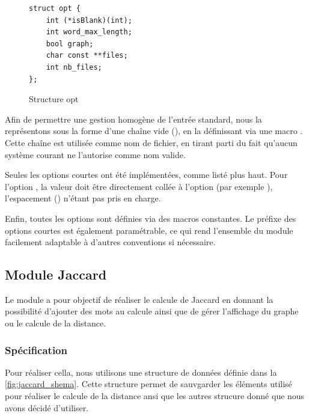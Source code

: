 \documentclass[a4paper, 12pt]{article}
\newcommand{\code}{\commandbox}
\begin{document}
\begin{figure}[h]
\centering
\begin{tcolorbox}[center upper,
enhanced,
colback=darkWhite,
boxrule=0pt,
frame hidden,
width=0.5\textwidth]
\begin{lstlisting}[style=bigCode]
struct opt {
    int (*isBlank)(int);
    int word_max_length;
    bool graph;
    char const **files;
    int nb_files;
};
\end{lstlisting}
\end{tcolorbox}
\caption{Structure opt}
\label{fig:structure_opt}
\end{figure}

Afin de permettre une gestion homogène de l’entrée standard, nous la représentons sous la forme d’une chaîne vide (\code{""}), en la définissant via une macro \code{STDIN}. Cette chaîne est utilisée comme nom de fichier, en tirant parti du fait qu’aucun système courant ne l’autorise comme nom valide.

Seules les options courtes ont été implémentées, comme listé plus haut. Pour l’option \code{-iVALUE}, la valeur doit être directement collée à l’option (par exemple \code{-i3}), l’espacement (\code{-i 3}) n’étant pas pris en charge.

Enfin, toutes les options sont définies via des macros constantes. Le préfixe des options courtes est également paramétrable, ce qui rend l’ensemble du module facilement adaptable à d’autres conventions si nécessaire.


\subsection{Module Jaccard}

Le module \code{jaccard} a pour objectif de réaliser le calcule de Jaccard en donnant la possibilité d'ajouter des mots au calcule ainsi que de gérer l'affichage du graphe ou le calcule de la distance.

\subsubsection{Spécification}

Pour réaliser cella, nous utilisons une structure de données définie dans la \autoref{fig:jaccard_shema}. Cette structure permet de sauvgarder les éléments utilisé pour réaliser le calcule de la distance ansi que les autres strucure donné que nous avons décidé d'utiliser. 
\end{document}
